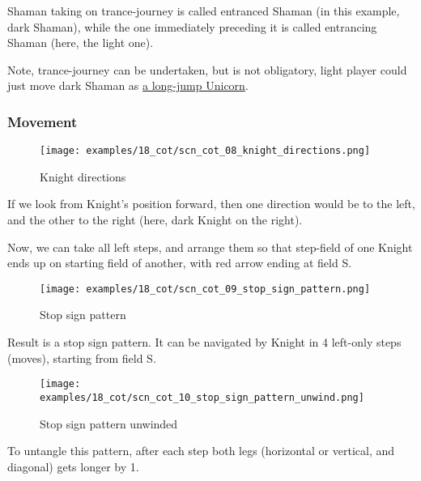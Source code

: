 Shaman taking on trance-journey is called entranced Shaman (in this example, dark Shaman),
while the one immediately preceding it is called entrancing Shaman (here, the light one).

Note, trance-journey can be undertaken, but is not obligatory, light player could just
move dark Shaman as \hyperref[fig:scn_cot_04_dark_shaman_step_ply]{a long-jump Unicorn}.

\subsubsection*{Movement}

\noindent
\begin{wrapfigure}{l}{0.4\textwidth} %
\centering
\texttt{[image: examples/18\_cot/scn\_cot\_08\_knight\_directions.png]}
\caption{Knight directions}
\label{fig:scn_cot_08_knight_directions}
\end{wrapfigure}
If we look from Knight's position forward, then one direction would be to the left, and
the other to the right (here, dark Knight on the right).

Now, we can take all left steps, and arrange them so that step-field of one Knight ends up
on starting field of another, with red arrow ending at field S.

\clearpage %

\noindent
\begin{wrapfigure}[4]{l}{0.4\textwidth} %
\centering
\texttt{[image: examples/18\_cot/scn\_cot\_09\_stop\_sign\_pattern.png]}
\caption{Stop sign pattern}
\label{fig:scn_cot_09_stop_sign_pattern}
\end{wrapfigure}
Result is a stop sign pattern. It can be navigated by Knight in 4 left-only steps (moves),
starting from field S.

\vspace*{0.30\textheight}
\noindent
\begin{wrapfigure}{l}{0.4\textwidth} %
\centering
\texttt{[image: examples/18\_cot/scn\_cot\_10\_stop\_sign\_pattern\_unwind.png]}
\caption{Stop sign pattern unwinded}
\label{fig:scn_cot_10_stop_sign_pattern_unwind}
\end{wrapfigure}
To untangle this pattern, after each step both legs (horizontal or vertical, and diagonal)
gets longer by 1.

